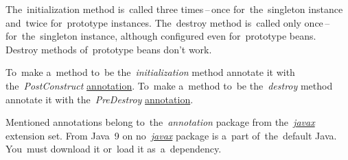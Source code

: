 \noindent The~initialization method is~called three times\,--\,once for~the~singleton instance and~twice for~prototype instances.
The~destroy method is~called only once\,--\,for~the~singleton instance, although configured even for~prototype beans.
Destroy methods of~prototype beans don't work.

\label{beanlifecycleannotations}
To~make a~method to~be the~\textit{initialization} method annotate it with the~\textit{PostConstruct} \hyperref[javaannotation]{annotation}.
To~make a~method to~be the~\textit{destroy} method annotate it with the~\textit{PreDestroy} \hyperref[javaannotation]{annotation}.

\warning Mentioned annotations belong to~the~\textit{annotation} package from the~\hyperref[javax]{\textit{javax}} extension set.
From Java~9 on no~\hyperref[javax]{\textit{javax}} package is a~part of~the~default Java.
You~must download it or~load it as~a~dependency.

